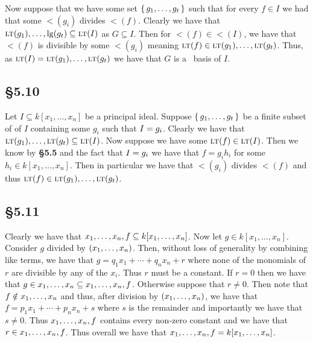 \documentclass[letterpaper]{article}
\begin{document}
Now suppose that we have some set $\set{g_{1}, \ldots, g_{t}}$ such that for every $f \in I$ we had that some $\lt(g_{i})$ divides $\lt(f)$.
Clearly we have that $\ideal{\lt(g_{1}), \ldots, \lg(g_{t})} \subseteq \ideal{\lt(I)}$ as $G \subseteq I$.
Then for $\lt(f) \in \lt(I)$, we have that $\lt(f)$ is divisible by some $\lt(g_{i})$ meaning $\lt(f) \in \ideal{\lt(g_{1}), \ldots, \lt(g_{t})}$.
Thus, as $\ideal{\lt(I)} = \ideal{\lt(g_{1}), \ldots, \lt(g_{t})}$ we have that $G$ is a \Grobner\ basis of $I$.

\subsection*{\S 5.10}

Let $I \subseteq k[x_{1}, \ldots, x_{n}]$ be a principal ideal.
Suppose $\set{g_{1}, \ldots, g_{t}}$ be a finite subset of of $I$ containing some $g_{i}$ such that $I = \gen{g_{i}}$.
Clearly we have that $\gen{\lt(g_{1}), \ldots, \lt(g_{t})} \subseteq \gen{\lt(I)}$.
Now suppose we have some $\lt(f) \in \gen{\lt(I)}$.
Then we know by \textbf{\S 5.5} and the fact that $I = \gen{g_{i}}$ we have that $f = g_{i} h_{i}$ for some $h_{i} \in k[x_{1}, \ldots, x_{n}]$.
Then in particular we have that $\lt(g_{i})$ divides $\lt(f)$ and thus $\lt(f) \in \gen{\lt(g_{1}), \ldots, \lt(g_{t})}$.

\subsection*{\S 5.11}

Clearly we have that $\gen{x_{1}, \ldots, x_{n}, f} \subseteq k[x_{1}, \ldots, x_{n}]$.
Now let $g \in k[x_{1}, \ldots, x_{n}]$.
Consider $g$ divided by $\pqty{x_{1}, \ldots, x_{n}}$.
Then, without loss of generality by combining like terms, we have that $g = q_{1}x_{1} + \cdots + q_{n}x_{n} + r$ where none of the monomials of $r$ are divisible by any of the $x_{i}$.
Thus $r$ must be a constant.
If $r = 0$ then we have that $g \in \gen{x_{1}, \ldots, x_{n}} \subseteq \gen{x_{1}, \ldots, x_{n}, f}$.
Otherwise suppose that $r \neq 0$.
Then note that $f \notin \gen{x_{1}, \ldots, x_{n}}$ and thus, after division by $\pqty{x_{1}, \ldots, x_{n}}$, we have that $f = p_{1}x_{1} + \cdots + p_{n}x_{n} + s$ where $s$ is the remainder and importantly we have that $s \neq 0$.
Thus $\gen{x_{1}, \ldots, x_{n}, f}$ contains every non-zero constant and we have that $r \in \gen{x_{1}, \ldots, x_{n}, f}$.
Thus overall we have that $\gen{x_{1}, \ldots, x_{n}, f} = k[x_{1}, \ldots, x_{n}]$.
\end{document}
